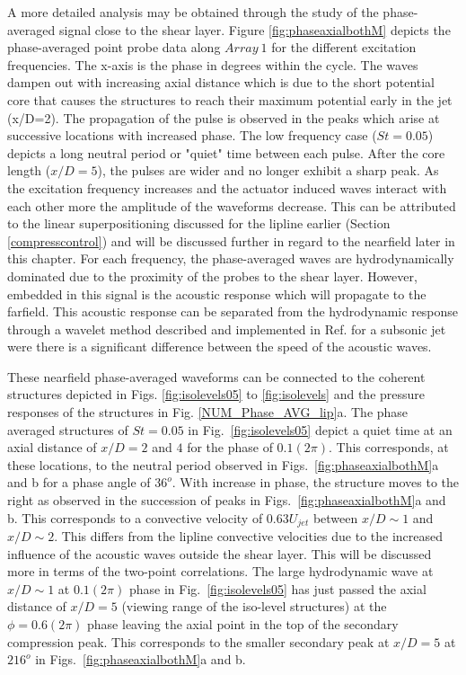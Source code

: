 \documentclass[english]{aiaa-tc}
\begin{document}
A more detailed analysis may be obtained through the study of the phase-averaged signal close to the shear layer.
Figure \ref{fig:phaseaxialbothM} depicts the phase-averaged point probe data along $Array~1$ for the different excitation frequencies. The x-axis is the phase in degrees within the cycle. The waves dampen out with increasing axial distance which is due to the short potential core that causes the structures to reach their maximum potential early in the jet (x/D=2). %
The propagation of the pulse is observed in the peaks which arise at
successive locations with increased phase. The low frequency case
($St=0.05$) depicts a long neutral period or "quiet" time between each
pulse. After the core length ($x/D=5$), the pulses are wider and no
longer exhibit a sharp peak.
As the excitation frequency increases and the actuator induced waves interact with each other more the amplitude of the waveforms decrease. This can be attributed to the linear superpositioning discussed for the lipline earlier (Section \ref{compresscontrol}) and will be discussed further in regard to the nearfield later in this chapter.
For each frequency, the phase-averaged waves are hydrodynamically dominated due to the proximity of the probes to the shear layer. However, embedded in this signal is the acoustic response which will propagate to the farfield. This acoustic response can be separated from the hydrodynamic response through a wavelet method described and implemented in Ref. \cite{Crawley2015} for a subsonic jet were there is a significant difference between the speed of the acoustic waves.

These nearfield phase-averaged waveforms can be connected to the coherent structures depicted in Figs. \ref{fig:isolevels05} to \ref{fig:isolevels} and the pressure responses of the structures in Fig. \ref{NUM_Phase_AVG_lip}a.
The phase averaged structures of $St=0.05$ in
Fig.~\ref{fig:isolevels05} depict a quiet time at an axial distance of $x/D=2$
and $4$ for the phase of $0.1(2\pi)$. This corresponds, at these
locations, to the neutral period observed in Figs.~\ref{fig:phaseaxialbothM}a and b for
a phase angle of $36^o$.  With increase in phase, the structure moves
to the right as observed in the succession of peaks in
Figs.~\ref{fig:phaseaxialbothM}a and b.  This corresponds to a convective
velocity of $0.63U_{jet}$ between $x/D\sim 1$ and $x/D\sim 2$. This differs from the lipline convective velocities due to the increased influence of the acoustic waves outside the shear layer. This will be discussed more in terms of the two-point correlations.
The large hydrodynamic wave at $x/D\sim 1$ at
$0.1(2\pi)$ phase in Fig.~\ref{fig:isolevels05} has just passed the axial
distance of $x/D=5$ (viewing range of the iso-level structures) at the
$\phi=0.6(2\pi)$ phase leaving the axial point in the top of the secondary compression peak. This corresponds to the smaller secondary peak at
$x/D=5$ at $216^o$ in Figs.~\ref{fig:phaseaxialbothM}a and b.
\end{document}
